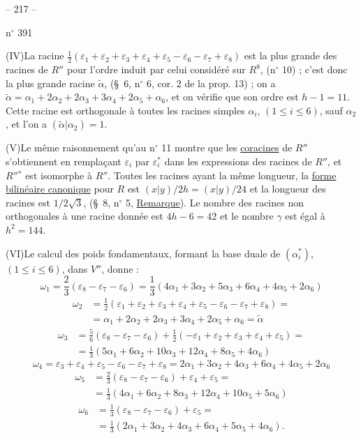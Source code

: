 
\begin{center}-- 217 --\end{center}
\hfill n$^{\circ}$ 391

(IV)\quad La racine $\frac12(\varepsilon_1+\varepsilon_2+\varepsilon_3+\varepsilon_4+\varepsilon_5-\varepsilon_6-\varepsilon_7+\varepsilon_8)$ est la plus grande
des racines de $R''$ pour l'ordre induit par celui considéré sur $R^8$, (n$^{\circ}$ 10) ;
c'est donc la plus grande racine $\tilde\alpha$, (\S\ 6, n$^{\circ}$ 6, cor. 2 de la prop. 13) ; on a
$\tilde\alpha=\alpha_1+2\alpha_2+2\alpha_3+3\alpha_4+2\alpha_5+\alpha_6$, et on vérifie que son ordre est $h-1=11$.
Cette racine est orthogonale à toutes les racines simples $\alpha_i$, $(1\leq i\leq6)$, sauf
$\alpha_2$, et l'on a $(\tilde\alpha|\alpha_2)=1$.

(V)\quad Le même raisonnement qu'au n$^{\circ}$ 11 montre que les \uline{coracines} de $R''$ s'obtiennent
en remplaçant $\varepsilon_i$ par $\varepsilon_i^*$ dans les expressions des racines de $R''$, et $R''{}^*$ est
isomorphe à $R''$. Toutes les racines ayant la même longueur, la \uline{forme bilinéaire
canonique} pour $R$ est $(x|y)/2h=(x|y)/24$ et la longueur des racines est $1/2\sqrt3$,
(\S\ 8, n$^{\circ}$ 5, \uline{Remarque}). Le nombre des racines non orthogonales à une racine
donnée est $4h-6=42$ et le nombre $\gamma$ est égal à $h^2=144$.

(VI)\quad Le calcul des poids fondamentaux, formant la base duale de $(\alpha_i^*)$,
$(1\leq i\leq6)$, dans $V''$, donne :
\[
\omega_1=\frac23(\varepsilon_8-\varepsilon_7-\varepsilon_6)
=\frac13(4\alpha_1+3\alpha_2+5\alpha_3+6\alpha_4+4\alpha_5+2\alpha_6)
\]
\[
\begin{aligned}
\omega_2&=\frac12(\varepsilon_1+\varepsilon_2+\varepsilon_3+\varepsilon_4+
\varepsilon_5-\varepsilon_6-\varepsilon_7+\varepsilon_8)=\\
&=\alpha_1+2\alpha_2+2\alpha_3+3\alpha_4+2\alpha_5+\alpha_6=\tilde\alpha
\end{aligned}
\]
\[
\begin{aligned}
\omega_3&=\frac56(\varepsilon_8-\varepsilon_7-\varepsilon_6)
+\frac12(-\varepsilon_1+\varepsilon_2+\varepsilon_3+\varepsilon_4+\varepsilon_5)=\\
&=\frac13(5\alpha_1+6\alpha_2+10\alpha_3+12\alpha_4+8\alpha_5+4\alpha_6)
\end{aligned}
\]
\[
\omega_4=\varepsilon_3+\varepsilon_4+\varepsilon_5-\varepsilon_6-\varepsilon_7+\varepsilon_8
=2\alpha_1+3\alpha_2+4\alpha_3+6\alpha_4+4\alpha_5+2\alpha_6
\]
\[
\begin{aligned}
\omega_5&=\frac23(\varepsilon_8-\varepsilon_7-\varepsilon_6)+\varepsilon_4+\varepsilon_5=\\
&=\frac13(4\alpha_1+6\alpha_2+8\alpha_3+12\alpha_4+10\alpha_5+5\alpha_6)
\end{aligned}
\]
\[
\begin{aligned}
\omega_6&=\frac13(\varepsilon_8-\varepsilon_7-\varepsilon_6)+\varepsilon_5=\\
&=\frac13(2\alpha_1+3\alpha_2+4\alpha_3+6\alpha_4+5\alpha_5+4\alpha_6).
\end{aligned}
\]

